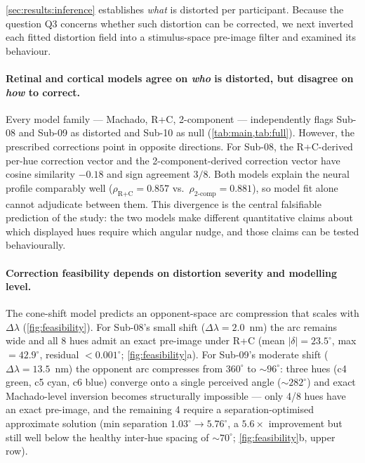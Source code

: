 \cref{sec:results:inference} establishes \emph{what} is distorted per
participant. Because the question Q3 concerns whether such distortion
can be corrected, we next inverted each fitted distortion field into a
stimulus-space pre-image filter and examined its behaviour.

\paragraph{Retinal and cortical models agree on \emph{who} is
distorted, but disagree on \emph{how} to correct.}
Every model family --- Machado, R+C, 2-component --- independently
flags Sub-08 and Sub-09 as distorted and Sub-10 as null
(\cref{tab:main,tab:full}). However, the prescribed corrections point
in opposite directions. For Sub-08, the R+C-derived per-hue
correction vector and the 2-component-derived correction vector have
cosine similarity $-0.18$ and sign agreement $3/8$. Both models
explain the neural profile comparably well
($\rho_{\text{R+C}} = 0.857$ vs.\ $\rho_{\text{2-comp}} = 0.881$), so
model fit alone cannot adjudicate between them. This divergence is the
central falsifiable prediction of the study: the two models make
different quantitative claims about which displayed hues require
which angular nudge, and those claims can be tested behaviourally.

\paragraph{Correction feasibility depends on distortion severity and
modelling level.}
The cone-shift model predicts an opponent-space arc compression that
scales with $\Delta\lambda$ (\cref{fig:feasibility}). For Sub-08's
small shift ($\Delta\lambda = 2.0$~nm) the arc remains wide and all 8
hues admit an exact pre-image under R+C (mean $|\delta| = 23.5^\circ$,
max $= 42.9^\circ$, residual $< 0.001^\circ$; \cref{fig:feasibility}a).
For Sub-09's moderate shift ($\Delta\lambda = 13.5$~nm) the opponent
arc compresses from $360^\circ$ to $\sim 96^\circ$: three hues
(c4 green, c5 cyan, c6 blue) converge onto a single perceived angle
($\sim 282^\circ$) and exact Machado-level inversion becomes
structurally impossible --- only 4/8 hues have an exact pre-image, and
the remaining 4 require a separation-optimised approximate solution
(min separation $1.03^\circ \to 5.76^\circ$, a $5.6\times$
improvement but still well below the healthy inter-hue spacing of
$\sim 70^\circ$; \cref{fig:feasibility}b, upper row).

